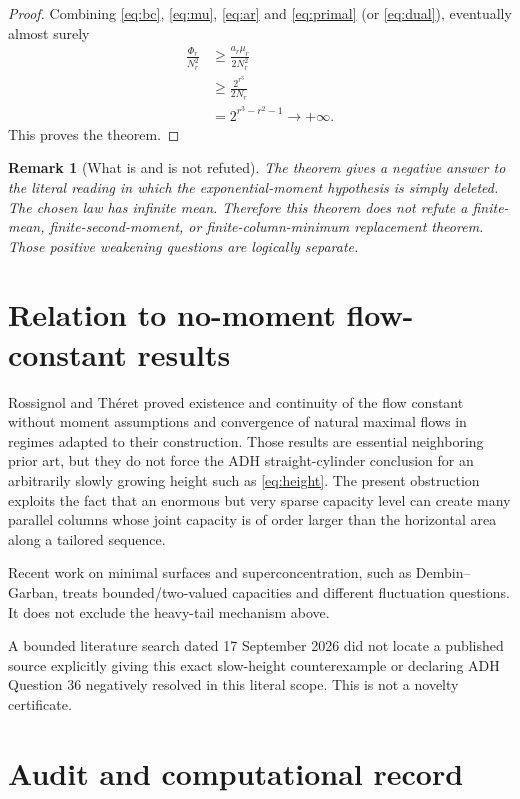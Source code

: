 \documentclass[11pt]{article}
\newtheorem{remark}{Remark}
\begin{document}
\begin{proof}
Combining \eqref{eq:bc}, \eqref{eq:mu}, \eqref{eq:ar} and \eqref{eq:primal} (or \eqref{eq:dual}), eventually almost surely
\begin{align*}
  \frac{\Phi_r}{N_r^2}
  &\ge \frac{a_r\mu_r}{2N_r^2}\\
  &\ge \frac{2^{r^3}}{2N_r}\\
  &=2^{r^3-r^2-1}
  \longrightarrow+\infty.
\end{align*}
This proves the theorem.
\end{proof}

\begin{remark}[What is and is not refuted]
The theorem gives a negative answer to the literal reading in which the exponential-moment hypothesis is simply deleted.  The chosen law has infinite mean.  Therefore this theorem does not refute a finite-mean, finite-second-moment, or finite-column-minimum replacement theorem.  Those positive weakening questions are logically separate.
\end{remark}

\section{Relation to no-moment flow-constant results}

Rossignol and Th\'eret proved existence and continuity of the flow constant without moment assumptions and convergence of natural maximal flows in regimes adapted to their construction.  Those results are essential neighboring prior art, but they do not force the ADH straight-cylinder conclusion for an arbitrarily slowly growing height such as \eqref{eq:height}.  The present obstruction exploits the fact that an enormous but very sparse capacity level can create many parallel columns whose joint capacity is of order larger than the horizontal area along a tailored sequence.

Recent work on minimal surfaces and superconcentration, such as Dembin--Garban, treats bounded/two-valued capacities and different fluctuation questions.  It does not exclude the heavy-tail mechanism above.

A bounded literature search dated 17 September 2026 did not locate a published source explicitly giving this exact slow-height counterexample or declaring ADH Question 36 negatively resolved in this literal scope.  This is not a novelty certificate.

\section{Audit and computational record}
\end{document}
